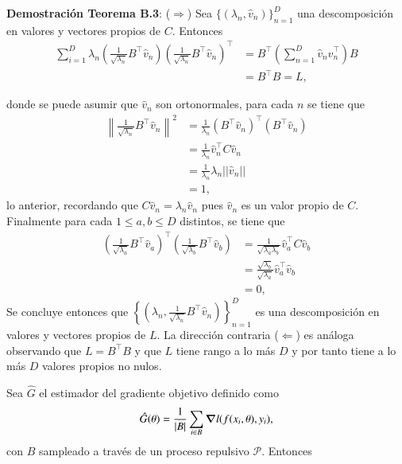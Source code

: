 \begin{appendixs}
    \vspace{0.2cm}
    
    \noindent \textbf{Demostración Teorema B.3}: 
    ($\Rightarrow$) Sea  $\{(\lambda_n , \hat{v}_n)\}_{n=1}^D$ una descomposición en valores y vectores propios de $C$. Entonces
    \begin{align*}
    \sum_{i=1}^D \lambda_n \left ( \frac{1}{\sqrt{\lambda_n}}B^{\top}\hat{v}_n\right ) \left ( \frac{1}{\sqrt{\lambda_n}}B^{\top}\hat{v}_n\right )^{\top} &= B^{\top} \left ( \sum_{n=1}^D \hat{v}_n\hat{v}^{\top}_n \right ) B \\
    & = B^{\top}B = L , 
    \end{align*}
    
    \noindent donde se puede asumir que $\hat{v}_n$ son ortonormales, para cada $n$ se tiene que 
    \begin{align*}
    \left\| \frac{1}{\sqrt{\lambda_n}}B^{\top}\hat{v}_n \right\|^2 &= \frac{1}{\lambda_n}(B^{\top}\hat{v}_n)^{\top}(B^{\top}\hat{v}_n) \\
    &= \frac{1}{\lambda_n}\hat{v}^{\top}_n C \hat{v}_n \\
    &= \frac{1}{\lambda_n}\lambda_n ||\hat{v}_n|| \\
    &= 1 , 
    \end{align*}
    lo anterior, recordando que $C\hat{v}_n = \lambda_n\hat{v}_n$ pues $\hat{v}_n$ es un valor propio de $C$. Finalmente para cada $1 \leq a,b \leq D$ distintos, se tiene que 
    \begin{align*}
    \left ( \frac{1}{\sqrt{\lambda_a}}B^{\top}\hat{v}_a \right )^{\top}\left( \frac{1}{\sqrt{\lambda_b}}B^{\top}\hat{v}_b \right ) &= \frac{1}{\sqrt{\lambda_a\lambda_b}}\hat{v}^{\top}_aC\hat{v}_b \\
    &= \frac{\sqrt{\lambda_b}}{\sqrt{\lambda_a}}\hat{v}^{\top}_a\hat{v}_b \\
    &= 0 , 
    \end{align*}
    Se concluye entonces que $\left \{ \left (\lambda_n , \frac{1}{\sqrt{\lambda_n}}B^{\top}\hat{v}_n \right )\right \}_{n=1}^D$ es una descomposición en valores y vectores propios de $L$. La dirección contraria ($\Leftarrow$) es análoga observando que $L = B^{\top}B$ y que $L$ tiene rango a lo más $D$ y por tanto tiene a lo más $D$ valores propios no nulos.
    
    \begin{teo}\hypertarget{Teorema B.4}{}
    Sea $\hat{G}$ el estimador del gradiente objetivo definido como 
    \[
    \hat{G}(\theta) = \frac{1}{|B|}\sum_{i \in B}\grad l(f(x_i , \theta),y_i) , 
    \]
    con $B$ sampleado a través de un proceso repulsivo $\mathcal{P}$. Entonces 
    

\end{teo}
\end{appendixs}
